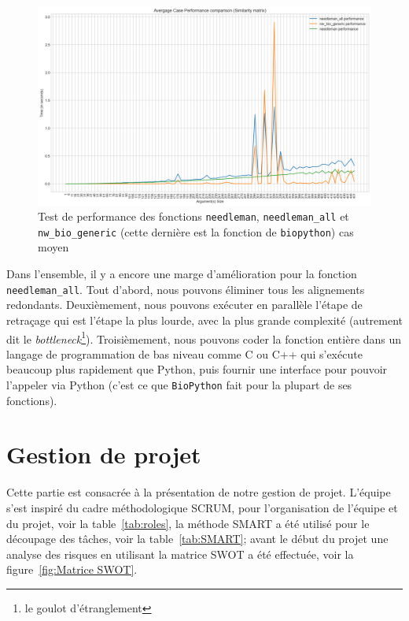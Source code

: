 \documentclass[12pt]{article}
\begin{document}
    \begin{figure}[!h]
        \centering
        \includegraphics[scale=0.4]{Images/Performance/Needleman-Wunsch/performance_needleman_all_average.png}
        \caption{Test de performance des fonctions \texttt{needleman}, \texttt{needleman\_all} et \texttt{nw\_bio\_generic} (cette dernière est la fonction de \texttt{biopython}) cas moyen}
        \label{perfnwavg}
    \end{figure}
   

Dans l'ensemble, il y a encore une marge d'amélioration pour la fonction \texttt{needleman\_all}. Tout d'abord, nous pouvons éliminer tous les alignements redondants. Deuxièmement, nous pouvons exécuter en parallèle l'étape de retraçage qui est l'étape la plus lourde, avec la plus grande complexité (autrement dit le \textsl{bottleneck}\footnote{le goulot d'étranglement}). Troisièmement, nous pouvons coder la fonction entière dans un langage de programmation de bas niveau comme \textsf{C} ou \textsf{C++} qui s'exécute beaucoup plus rapidement que \textsf{Python}, puis fournir une interface pour pouvoir l'appeler via \textsf{Python} (c'est ce que \texttt{BioPython} fait pour la plupart de ses fonctions).

\newpage

\section{Gestion de projet}
Cette partie est consacrée à la présentation de notre gestion de projet. L'équipe s'est inspiré du cadre méthodologique SCRUM, pour l'organisation de l'équipe et du projet, voir la table~\ref{tab:roles}, la méthode SMART a été utilisé pour le découpage des tâches, voir la table~\ref{tab:SMART}; avant le début du projet une analyse des risques en utilisant la matrice SWOT a été effectuée, voir la figure~\ref{fig:Matrice SWOT}.
\end{document}
